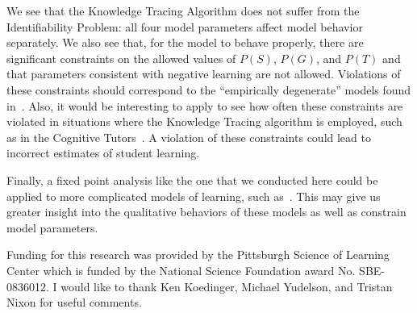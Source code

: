 \documentclass[jedm,acmnow]{acmtrans2m}
\begin{document}
We see that the Knowledge Tracing Algorithm does not suffer from
the Identifiability Problem:  all four model parameters
affect model behavior separately.  
We also see that, for the model to behave properly,  there are 
significant constraints on the allowed values of $P(S)$, $P(G)$, and $P(T)$
and that parameters consistent with negative learning are not allowed.
Violations of these constraints should correspond to the ``empirically
degenerate'' models found in~\cite{baker_more_2008}.
Also, it would be interesting to apply to see how often these constraints are
violated in situations where the  Knowledge Tracing algorithm is
employed, such as in the Cognitive Tutors~\cite{ritter_cognitive_2007}.
A violation of these constraints could lead to incorrect estimates of
student learning.

Finally, a fixed point analysis like the one that we conducted here could be
applied to more complicated models of learning, such 
as~\cite{baker_improving_2008,lee_impact_2012}.  This may give us
greater insight into the qualitative behaviors of these models as well
as constrain model parameters.


\begin{acks}
Funding for this research was provided by the Pittsburgh Science of
Learning Center which is funded by the National Science Foundation
award No. SBE-0836012.
I would like to thank Ken Koedinger, Michael Yudelson, and Tristan Nixon for
useful comments.
\end{acks}

\linespread{1}\selectfont
\normalsize


\end{document}
